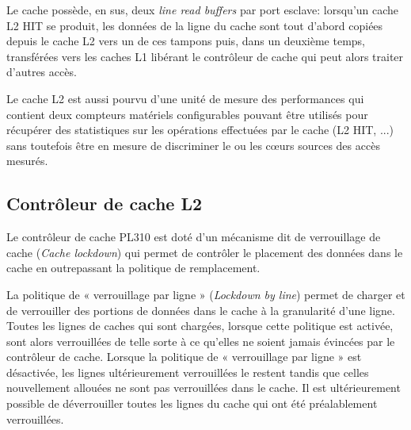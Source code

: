         Le cache possède, en sus, deux \emph{line read buffers} par port esclave: lorsqu'un cache L2 HIT se produit, les données de la ligne du cache sont tout d'abord copiées depuis le cache L2 vers un de ces tampons puis, dans un deuxième temps, transférées vers les caches L1 libérant le contrôleur de cache qui peut alors traiter d'autres accès.


        Le cache L2 est aussi pourvu d'une unité de mesure des performances qui contient deux compteurs matériels configurables pouvant être utilisés pour récupérer des statistiques sur les opérations effectuées par le cache (L2 HIT, ...) sans toutefois être en mesure de discriminer le ou les cœurs sources des accès mesurés.

        \subsection{Contrôleur de cache L2}

        Le contrôleur de cache PL310 est doté d'un mécanisme dit de verrouillage de cache (\emph{Cache lockdown}) qui permet de contrôler le placement des données dans le cache en outrepassant la politique de remplacement.

        La politique de « verrouillage par ligne » (\emph{Lockdown by line}) permet de charger et de verrouiller des portions de données dans le cache à la granularité d'une ligne. Toutes les lignes de caches qui sont chargées, lorsque cette politique est activée, sont alors verrouillées de telle sorte à ce qu'elles ne soient jamais évincées par le contrôleur de cache. Lorsque la politique de « verrouillage par ligne » est désactivée, les lignes ultérieurement verrouillées le restent tandis que celles nouvellement allouées ne sont pas verrouillées dans le cache. Il est ultérieurement possible de déverrouiller toutes les lignes du cache qui ont été préalablement verrouillées.

